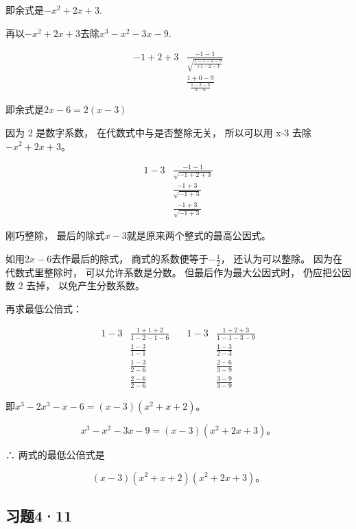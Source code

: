 即余式是\(-x^{2} + 2x + 3.\)

再以\(-x^{2} + 2x + 3\)去除\(x^{3} - x^{2} - 3x - 9.\)

\[
\begin{array}{rl} - 1 + 2 + 3 & \frac{- 1 - 1}{\sqrt {\frac{1 - 1 - 3 - 9}{+ 1 - 2 - 3}}} \\ & \frac{1 + 0 - 9}{\frac{1 - 2 - 3}{2 - 6}} \end{array}
\]

即余式是\(2x - 6 = 2(x - 3)\)

因为 2 是数字系数， 在代数式中与是否整除无关， 所以可以用 x-3
去除\(-x^{2}+2x+3\)。

\[
\begin{array}{rl} 1 - 3 & \frac{- 1 - 1}{\sqrt {- 1 + 2 + 3}} \\ & \frac{- 1 + 3}{\sqrt {- 1 + 3}} \\ & \frac{- 1 + 3}{\sqrt {- 1 + 3}} \end{array}
\]

刚巧整除， 最后的除式\(x - 3\)就是原来两个整式的最高公因式。

 如用\(2x - 6\)去作最后的除式，
商式的系数便等于\(-\frac{1}{2}\)， 还认为可以整除。
因为在代数式里整除时， 可以允许系数是分数。 但最后作为最大公因式时，
仍应把公因数 2 去掉， 以免产生分数系数。

再求最低公倍式：

\[
\begin{array}{rl} 1 - 3 & \frac{1 + 1 + 2}{1 - 2 - 1 - 6} \\ & \frac{1 - 3}{1 - 1} \\ & \frac{1 - 3}{2 - 6} \\ & \frac{2 - 6}{2 - 6} \end{array} \quad \begin{array}{rl} 1 - 3 & \frac{1 + 2 + 3}{1 - 1 - 3 - 9} \\ & \frac{1 - 3}{2 - 3} \\ & \frac{2 - 6}{3 - 9} \\ & \frac{3 - 9}{3 - 9} \end{array}
\]

即\(x^{3} - 2x^{3} - x - 6 = (x - 3)(x^{2} + x + 2)\)。

\[
x ^{3} - x ^{2} - 3 x - 9 = (x - 3) (x ^{2} + 2 x + 3)\text{。}
\]

∴ 两式的最低公倍式是

\[
(x - 3) (x ^{2} + x + 2) (x ^{2} + 2 x + 3)\text{。}
\]

\subsection{习题4·11}

